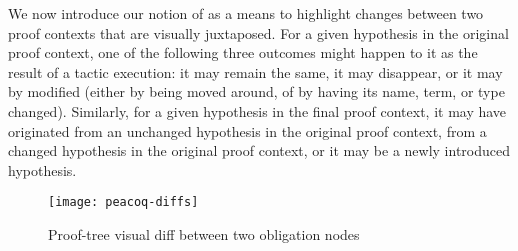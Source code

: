 We now introduce our notion of  as a means to highlight
changes between two proof contexts that are visually juxtaposed.  For a given
hypothesis in the original proof context, one of the following three outcomes
might happen to it as the result of a tactic execution: it may remain the same,
it may disappear, or it may by modified (either by being moved around, of by
having its name, term, or type changed).  Similarly, for a given hypothesis in
the final proof context, it may have originated from an unchanged hypothesis in
the original proof context, from a changed hypothesis in the original proof
context, or it may be a newly introduced hypothesis.


\begin{figure*}[!htp]
\texttt{[image: peacoq-diffs]}{\parfillskip=0pt\par}
\caption{Proof-tree visual diff between two obligation nodes}%
\label{proof-tree-diffs}
\end{figure*}

